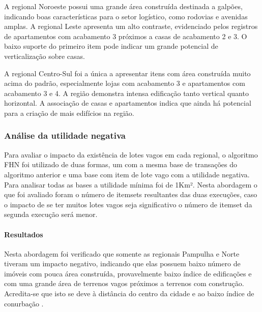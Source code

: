 \documentclass[12pt]{article}
\begin{document}
A regional Noroeste possui uma grande área construída destinada a galpões, indicando boas características para o setor logístico, como rodovias e avenidas amplas. A regional Leste apresenta um alto contraste, evidenciado pelos registros de apartamentos com acabamento 3 próximos a casas de acabamento 2 e 3. O baixo suporte do primeiro item pode indicar um grande potencial de verticalização sobre casas.

A regional Centro-Sul foi a única a apresentar itens com área construída muito acima do padrão, especialmente lojas com acabamento 3 e apartamentos com acabamento 3 e 4. A região demonstra intensa edificação tanto vertical quanto horizontal. A associação de casas e apartamentos indica que ainda há potencial para a criação de mais edifícios na região.

 \subsubsection{Análise da utilidade negativa}
Para avaliar o impacto da existência de lotes vagos em cada regional, o algoritmo FHN \cite{fournier2014fhn} foi utilizado de duas formas, um com a mesma base de transações do algoritmo anterior e uma base com item de lote vago com a utilidade negativa. Para analisar todas as bases a utilidade mínima foi de 1Km².
Nesta abordagem o que foi avaliado foram o número de itemsets resultantes das duas execuções, caso o impacto de se ter muitos lotes vagos seja significativo o número de itemset da segunda execução será menor.

\paragraph{Resultados}
Nesta abordagem foi verificado que somente as regionais Pampulha e Norte tiveram um impacto negativo, indicando que elas possuem baixo número de imóveis com pouca área construída, provavelmente baixo índice de edificações e com uma grande área de terrenos vagos próximos a terrenos com construção. Acredita-se que isto se deve à distância do centro da cidade e ao baixo índice de conurbação \cite{wiki:cornubacao}.
\end{document}
